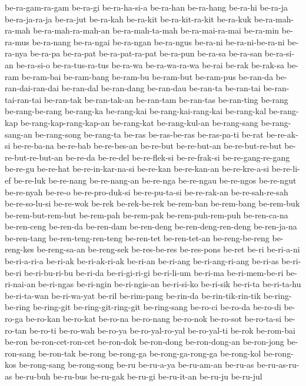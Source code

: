 {be-ra-gam-ra-gam be-ra-gi be-ra-ha-si-a be-ra-han be-ra-hang be-ra-hi
be-ra-ja be-ra-ja-ra-ja be-ra-jut be-ra-kah be-ra-kit be-ra-kit-ra-kit
be-ra-kuk be-ra-mah-ra-mah be-ra-mah-ra-mah-an be-ra-mah-ta-mah
be-ra-mai-ra-mai be-ra-min be-ra-mus be-ra-nang be-ra-ngai be-ra-ngan
be-ra-ngus be-ra-ni be-ra-ni-be-ra-ni be-ra-nya be-ra-pa be-ra-pat
be-ra-pat-ra-pat be-ra-pun be-ra-sa be-ra-san be-ra-si-an be-ra-si-o
be-ra-tus-ra-tus be-ra-wa be-ra-wa-ra-wa be-rai be-rak be-rak-sa be-ram
be-ram-bai be-ram-bang be-ram-bu be-ram-but be-ram-pus be-ran-da
be-ran-dai-ran-dai be-ran-dal be-ran-dang be-ran-dau be-ran-ta be-ran-tai
be-ran-tai-ran-tai be-ran-tak be-ran-tak-an be-ran-tam be-ran-tas
be-ran-ting be-rang be-rang-be-rang be-rang-ka be-rang-kai
be-rang-kai-rang-kai be-rang-kal be-rang-kap be-rang-kap-rang-kap-an
be-rang-kat be-rang-kul-an be-rang-sang be-rang-sang-an be-rang-song
be-rang-ta be-ras be-ras-be-ras be-ras-pa-ti be-rat be-re-ak-si
be-re-ba-na be-re-bab be-re-bes-an be-re-but be-re-but-an be-re-but-re-but
be-re-but-re-but-an be-re-da be-re-del be-re-flek-si be-re-frak-si
be-re-gang-re-gang be-re-gu be-re-hat be-re-in-kar-na-si be-re-kan
be-re-kan-an be-re-kre-a-si be-re-li-ef be-re-luk be-re-nang be-re-nang-an
be-re-nga be-re-ngau be-re-ngos be-re-ngut be-re-nyah be-re-o
be-re-pro-duk-si be-re-pu-ta-si be-re-rak-an be-re-sah-re-sah
be-re-so-lu-si be-re-wok be-rek be-rek-be-rek be-rem-ban be-rem-bang
be-rem-buk be-rem-but-rem-but be-rem-pah be-rem-pak be-rem-puh-rem-puh
be-ren-ca-na be-ren-ceng be-ren-da be-ren-dam be-ren-deng
be-ren-deng-ren-deng be-ren-ja-na be-ren-tang be-ren-teng-ren-teng
be-ren-tet be-ren-tet-an be-reng-be-reng be-reng-kes be-reng-sa-an
be-reng-sek be-res-be-res be-res-pons be-ret be-ri be-ri-a-ni be-ri-a-ri-a
be-ri-ak be-ri-ak-ri-ak be-ri-an be-ri-ang be-ri-ang-ri-ang be-ri-as
be-ri-be-ri be-ri-bu-ri-bu be-ri-da be-ri-gi-ri-gi be-ri-li-um be-ri-ma
be-ri-mem-be-ri be-ri-nai-an be-ri-ngas be-ri-ngin be-ri-ngis-an
be-ri-si-ko be-ri-sik be-ri-ta be-ri-ta-hu be-ri-ta-wan be-ri-wa-yat
be-ril be-rim-pang be-rin-da be-rin-tik-rin-tik be-ring-be-ring
be-ring-git be-ring-git-ring-git be-ring-sang be-ro-ci be-ro-da be-ro-di
be-ro-ga be-ro-kan be-ro-kat be-ro-na be-ro-nang be-ro-nok be-ro-sot
be-ro-ta-si be-ro-tan be-ro-ti be-ro-wah be-ro-ya be-ro-yal-ro-yal
be-ro-yal-ti be-rok be-rom-bai be-ron be-ron-cet-ron-cet be-ron-dok
be-ron-dong be-ron-dong-an be-ron-jong be-ron-sang be-ron-tak be-rong
be-rong-ga be-rong-ga-rong-ga be-rong-kol be-rong-kos be-rong-sang
be-rong-song be-ru be-ru-a-ya be-ru-am-an be-ru-as be-ru-as-ru-as
be-ru-buh be-ru-bus be-ru-gak be-ru-gi be-ru-it-an be-ru-ju be-ru-jul
}
